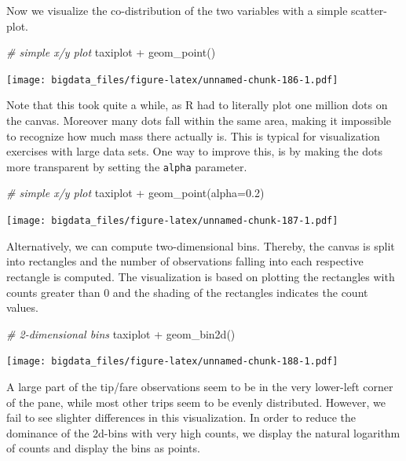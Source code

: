\documentclass[
  12pt,
]{style/krantz}
\newenvironment{Shaded}{\begin{snugshade}}{\end{snugshade}}
\newcommand{\AttributeTok}[1]{\textcolor[rgb]{0.77,0.63,0.00}{#1}}
\newcommand{\CommentTok}[1]{\textcolor[rgb]{0.56,0.35,0.01}{\textit{#1}}}
\newcommand{\FloatTok}[1]{\textcolor[rgb]{0.00,0.00,0.81}{#1}}
\newcommand{\FunctionTok}[1]{\textcolor[rgb]{0.00,0.00,0.00}{#1}}
\newcommand{\NormalTok}[1]{#1}
\newcommand{\SpecialCharTok}[1]{\textcolor[rgb]{0.00,0.00,0.00}{#1}}
\begin{document}
Now we visualize the co-distribution of the two variables with a simple scatter-plot.

\begin{Shaded}
\begin{Highlighting}[]
\CommentTok{\# simple x/y plot}
\NormalTok{taxiplot }\SpecialCharTok{+}
     \FunctionTok{geom\_point}\NormalTok{()}
\end{Highlighting}
\end{Shaded}

\texttt{[image: bigdata\_files/figure-latex/unnamed-chunk-186-1.pdf]}

Note that this took quite a while, as R had to literally plot one million dots on the canvas. Moreover many dots fall within the same area, making it impossible to recognize how much mass there actually is. This is typical for visualization exercises with large data sets. One way to improve this, is by making the dots more transparent by setting the \texttt{alpha} parameter.

\begin{Shaded}
\begin{Highlighting}[]
\CommentTok{\# simple x/y plot}
\NormalTok{taxiplot }\SpecialCharTok{+}
     \FunctionTok{geom\_point}\NormalTok{(}\AttributeTok{alpha=}\FloatTok{0.2}\NormalTok{)}
\end{Highlighting}
\end{Shaded}

\texttt{[image: bigdata\_files/figure-latex/unnamed-chunk-187-1.pdf]}

Alternatively, we can compute two-dimensional bins. Thereby, the canvas is split into rectangles and the number of observations falling into each respective rectangle is computed. The visualization is based on plotting the rectangles with counts greater than 0 and the shading of the rectangles indicates the count values.

\begin{Shaded}
\begin{Highlighting}[]
\CommentTok{\# 2{-}dimensional bins}
\NormalTok{taxiplot }\SpecialCharTok{+}
     \FunctionTok{geom\_bin2d}\NormalTok{()}
\end{Highlighting}
\end{Shaded}

\texttt{[image: bigdata\_files/figure-latex/unnamed-chunk-188-1.pdf]}

A large part of the tip/fare observations seem to be in the very lower-left corner of the pane, while most other trips seem to be evenly distributed. However, we fail to see slighter differences in this visualization. In order to reduce the dominance of the 2d-bins with very high counts, we display the natural logarithm of counts and display the bins as points.
\end{document}
